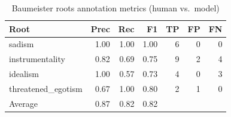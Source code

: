\begin{table}[h]
  \centering
  \begin{tabular}{lrrrrrr}
    \toprule
    Root & Prec & Rec & F1 & TP & FP & FN \\
    \midrule
    sadism & 1.00 & 1.00 & 1.00 & 6 & 0 & 0 \\
    instrumentality & 0.82 & 0.69 & 0.75 & 9 & 2 & 4 \\
    idealism & 1.00 & 0.57 & 0.73 & 4 & 0 & 3 \\
    threatened\_egotism & 0.67 & 1.00 & 0.80 & 2 & 1 & 0 \\
    \midrule
    Average & 0.87 & 0.82 & 0.82 & & & \\
    \bottomrule
  \end{tabular}
  \caption{Baumeister roots annotation metrics (human vs.\ model)}
\end{table}
